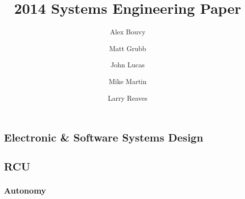 \documentclass{article}
\begin{document}
\title{2014 Systems Engineering Paper}
\author{Alex Bouvy \and Matt Grubb \and John Lucas \and Mike Martin \and Larry Reaves}
\maketitle
\pagebreak
\setcounter{tocdepth}{4}
\tableofcontents
\pagebreak
\begin{multicols}{2}
\section{Electronic \& Software Systems Design}
\subsection{RCU}
\subsubsection{Autonomy}



\end{multicols}
\end{document}
